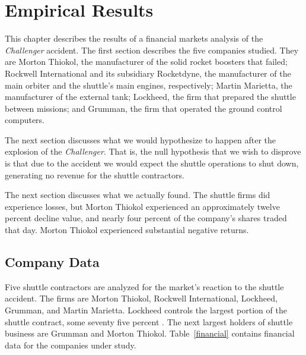 
\chapter{Empirical Results}\label{empiric}

This chapter describes the results of a financial markets
analysis of the {\em Challenger} accident.  The first
section describes the five companies studied.  They are
Morton Thiokol, the manufacturer of the solid rocket
boosters that failed; Rockwell International and its
subsidiary Rocketdyne, the
manufacturer of the main orbiter and the shuttle's main
engines, respectively; Martin Marietta, the manufacturer of
the external tank; Lockheed, the firm that prepared the
shuttle between missions; and Grumman, the firm that operated
the ground control computers.

The next section discusses what we would hypothesize to
happen after the explosion of the {\em Challenger}.  That
is, the null hypothesis that we wish to disprove is that due
to the accident we would expect the shuttle operations to
shut down, generating no revenue for the shuttle
contractors.

The next section discusses what we actually found.  The
shuttle firms did experience losses, but Morton Thiokol
experienced an approximately twelve percent decline
value, and nearly four percent of the company's
shares traded that day.  Morton Thiokol experienced
substantial negative returns.


\section{Company Data}

Five shuttle contractors are analyzed for the market's
reaction to the shuttle accident.  The firms are Morton
Thiokol, Rockwell International, Lockheed, Grumman, and Martin
Marietta.  Lockheed controls the largest portion of the
shuttle contract, some seventy five percent \cite{wsjfirms}.
The next largest holders of shuttle business are Grumman and
Morton Thiokol.  Table~\ref{financial} contains financial
data for the companies under study.

